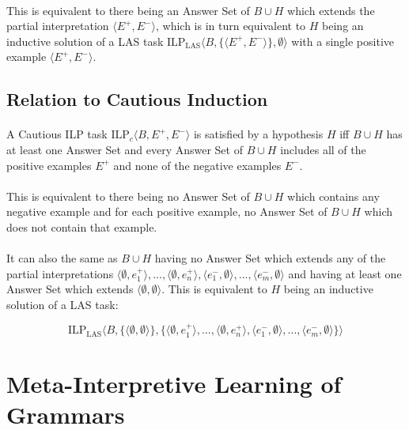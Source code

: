 \documentclass{article}
\theoremstyle{plain}
\theoremstyle{definition}
\begin{document}
\begin{multicols}{2}
\paragraph{} This is equivalent to there being an Answer Set of $B \cup H$ which extends the partial interpretation $\langle E^+, E^-\rangle$, which is in turn equivalent to $H$ being an inductive solution of a LAS task $\text{ILP}_\text{LAS} \langle B, \{\langle E^+, E^- \rangle\}, \emptyset\rangle$ with a single positive example $\langle E^+, E^-\rangle$.

\subsection{Relation to Cautious Induction}

\paragraph{} A Cautious ILP task $\text{ILP}_c\langle B, E^+, E^-\rangle$ is satisfied by a hypothesis $H$ iff $B \cup H$ has at least one Answer Set and every Answer Set of $B \cup H$ includes all of the positive examples $E^+$ and none of the negative examples $E^-$.

\paragraph{} This is equivalent to there being no Answer Set of $B \cup H$ which contains any negative example and for each positive example, no Answer Set of $B \cup H$ which does not contain that example.

\paragraph{} It can also the same as $B \cup H$ having no Answer Set which extends any of the partial interpretations $\langle \emptyset, e^+_1\rangle, ..., \langle \emptyset, e^+_n\rangle, \langle e^-_1, \emptyset\rangle, ..., \langle e^-_m, \emptyset\rangle$ and having at least one Answer Set which extends $\langle \emptyset, \emptyset \rangle$. This is equivalent to $H$ being an inductive solution of a LAS task:

$$\text{ILP}_\text{LAS} \langle B, \{\langle \emptyset, \emptyset \rangle\}, \{\langle \emptyset, e^+_1\rangle, ..., \langle \emptyset, e^+_n\rangle, \langle e^-_1, \emptyset\rangle, ..., \langle e^-_m, \emptyset\rangle\}\rangle$$

\section{Meta-Interpretive Learning of Grammars}


\end{multicols}
\end{document}
